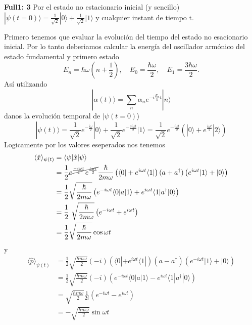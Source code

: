 \begin{ejercicio}
\textbf{Full1: 3} 
Por el estado no estacionario inicial (y sencillo) $|\psi(t=0)\rangle =
\frac{1}{\sqrt{2}} |0\rangle + \frac{1}{\sqrt{2}} | 1 \rangle$ y cualquier
instant de tiempo t. 
\end{ejercicio}
\begin{solucion}
Primero tenemos que evaluar la evolución del tiempo del estado no esacionario
inicial. Por lo tanto deberiamos calcular la energía del oscillador armónico
del estado fundamental y primero estado
\begin{equation*}
	E_n = \hbar \omega (n + \frac{1}{2}), \quad E_0 = \frac{\hbar \omega}{2}
,\quad E_1 = \frac{3 \hbar \omega}{2}.
\end{equation*}
Así utilizando
\begin{equation*}
	|\alpha (t)\rangle = \sum_n \alpha_n e^{-i\frac{E_n}{\hbar} t} | n\rangle
\end{equation*}
danos la evolución temporal de $|\psi(t=0)\rangle$ 
\begin{equation*}
	|\psi(t)\rangle = \frac{1}{\sqrt{2}} e^{-\frac{i\omega}{2}}|0\rangle
+ \frac{1}{\sqrt{2}} e^{-\frac{3 i \omega t}{2}} |1 \rangle  = \frac{1}{\sqrt{2}}
e^{-\frac{i\omega t}{2}} \left( |0\rangle + e^{\frac{i \omega t}{2}} |
2\rangle \right)
\end{equation*}
Logicamente por los valores eseperados nos tenemos
\begin{align*}
	\langle \hat x \rangle_{\psi(t)} &= \langle \psi | \hat x | \psi \rangle \\
	&= \frac{1}{2} \cancel{e^{\frac{- i \omega t}{2}}e^{\frac{i \omega t}{2}}}
\frac{\hbar}{2m\omega} \left( \langle 0| + e^{i\omega t} \langle 1 | \right) ( a +
a^\dagger) \left( e^{i\omega t} | 1 \rangle + | 0 \rangle \right) \\
	&= \frac{1}{2} \sqrt{\frac{\hbar}{2m\omega}} \left( e^{-i\omega t}\langle 0
| a | 1 \rangle + e^{i\omega t} \langle 1 | a^\dagger | 0 \rangle \right) \\
	&= \frac{1}{2} \sqrt{\frac{\hbar}{2m\omega}} \left( e^{-i\omega t} + e^{i
\omega t} \right) \\
	&= \frac{1}{2} \sqrt{\frac{\hbar}{2m\omega}} \cos{\omega t}  
\end{align*}
y 
\begin{align*}
	\langle \hat p \rangle_{\psi(t)} &= \frac{1}{2} \sqrt{\frac{\hbar m
\omega}{2}} (-i) \left( \langle 0| + e^{i\omega t} \langle 1| \right) (a -
a^\dagger) \left( e^{-i\omega t} |1\rangle + |0\rangle \right) \\
	&= \frac{1}{2} \sqrt{\frac{\hbar m \omega}{2}} (-i) \left( e^{-i\omega
t}\langle 0 | a | 1 \rangle - e^{i\omega t} \langle 1| a^\dagger | 0 \rangle
\right) \\
	&= \sqrt{\frac{\hbar m \omega}{2}} \frac{1}{2i}\left( e^{-i\omega t} -
e^{i \omega t} \right) \\
	&= -\sqrt{\frac{\hbar m \omega}{2}} \sin{\omega t}  
\end{align*}
\end{solucion}



